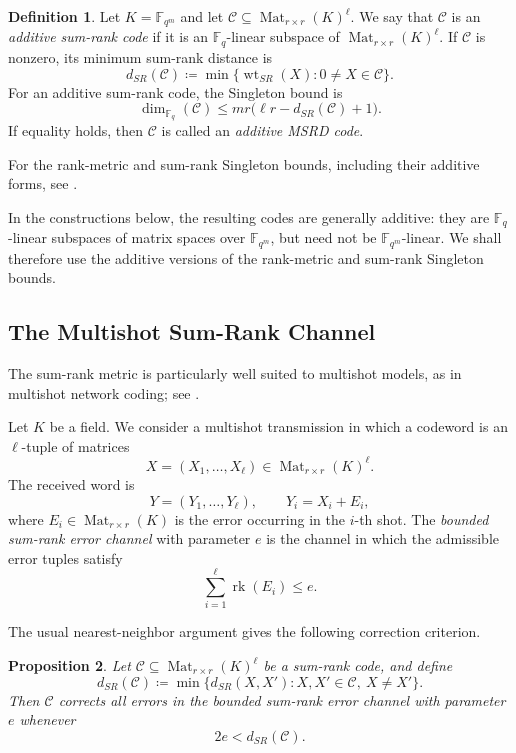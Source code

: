 \documentclass[10pt,a4paper]{amsart}
\DeclareMathOperator{\Mat}{Mat}
\DeclareMathOperator{\rk}{rk}
\DeclareMathOperator{\wt}{wt}
\theoremstyle{definition}
\newtheorem{definition}{Definition}[section]
\theoremstyle{plain}
\newtheorem{proposition}[definition]{Proposition}
\theoremstyle{remark}
\newcommand{\vF}{\mathbb F}
\begin{document}
\begin{definition}
Let $K=\vF_{q^m}$ and let $\mathcal C\subseteq \Mat_{r\times r}(K)^\ell$. We say that $\mathcal C$ is an \emph{additive sum-rank code} if it is an $\vF_q$-linear subspace of $\Mat_{r\times r}(K)^\ell$. If $\mathcal C$ is nonzero, its minimum sum-rank distance is
$$
d_{SR}(\mathcal C)
\coloneqq
\min\{\wt_{SR}(X):0\neq X\in\mathcal C\}.
$$
For an additive sum-rank code, the Singleton bound is
$$
\dim_{\vF_q}(\mathcal C)
\leq
mr\bigl(\ell r-d_{SR}(\mathcal C)+1\bigr).
$$
If equality holds, then $\mathcal C$ is called an \emph{additive MSRD code}.
\end{definition}

For the rank-metric and sum-rank Singleton bounds, including their additive
forms, see \cite{Del78,MtP18,CampsEtAl22}.

In the constructions below, the resulting codes are generally additive: they are $\vF_q$-linear subspaces of matrix spaces over $\vF_{q^m}$, but need not be $\vF_{q^m}$-linear. We shall therefore use the additive versions of the rank-metric and sum-rank Singleton bounds.

\subsection{The Multishot Sum-Rank Channel}

The sum-rank metric is particularly well suited to multishot models, as in multishot network coding; see \cite{NU10,MPK19}.

Let $K$ be a field. We consider a multishot transmission in which a codeword is an $\ell$-tuple of matrices
$$
X=(X_1,\ldots,X_\ell)\in \Mat_{r\times r}(K)^\ell.
$$
The received word is
$$
Y=(Y_1,\ldots,Y_\ell),
\qquad
Y_i=X_i+E_i,
$$
where $E_i\in \Mat_{r\times r}(K)$ is the error occurring in the $i$-th shot. The \emph{bounded sum-rank error channel} with parameter $e$ is the channel in which the admissible error tuples satisfy
$$
\sum_{i=1}^{\ell}\rk(E_i)\leq e.
$$

The usual nearest-neighbor argument gives the following correction criterion.

\begin{proposition}
\label{prop:sum-rank-channel-correction}
Let $\mathcal C\subseteq \Mat_{r\times r}(K)^\ell$ be a sum-rank code, and define
$$
d_{SR}(\mathcal C)
\coloneqq
\min\{d_{SR}(X,X'):X,X'\in\mathcal C,\ X\neq X'\}.
$$
Then $\mathcal C$ corrects all errors in the bounded sum-rank error channel with parameter $e$ whenever
$$
2e<d_{SR}(\mathcal C).
$$
\end{proposition}
\end{document}
